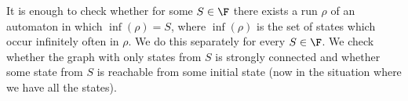 %
%

{
It is enough to check whether for some $S \in \F$ there exists a run $\rho$ of an automaton in which $\inf(\rho) = S$,
where $\inf(\rho)$ is the set of states which occur infinitely often in $\rho$.
We do this separately for every $S \in \F$. We check whether the graph with only states from $S$ is strongly connected
and whether some state from $S$ is reachable from some initial state (now in the situation where we have all the states).
}



